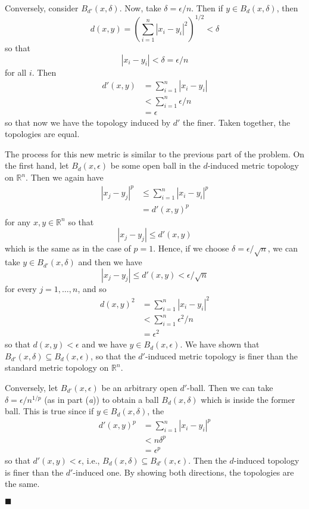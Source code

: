 \documentclass[12pt]{article}
\renewcommand{\qed}{\hfill$\blacksquare$}
\renewenvironment{proof}{\begin{addmargin}[1em]{0em}\begin{newproof}}{\end{newproof}\end{addmargin}\qed}
\begin{document}
\begin{proof}
	Conversely, consider $B_{d'}\left(x,\delta\right)$. Now, take $\delta = \epsilon/n$. Then if $y \in B_{d}\left(x,\delta\right)$, then $$ d\left(x,y\right) = \left(\sum_{i=1}^n \left|x_i-y_i\right|^2\right)^{1/2} < \delta $$ so that $$ \left|x_i - y_i\right| < \delta = \epsilon/n $$ for all $i$. Then
\begin{align*}		
	d'\left(x,y\right) & = \sum_{i=1}^n \left|x_i-y_i\right| \\
	& < \sum_{i=1}^n \epsilon/n \\
	& = \epsilon
\end{align*}
so that now we have the topology induced by $d'$ the finer. Taken together, the topologies are equal.

	\item The process for this new metric is similar to the previous part of the problem. On the first hand, let $B_d\left(x,\epsilon\right)$ be some open ball in the $d$-induced metric topology on $\mathbb{R}^n$. Then we again have \begin{align*}
	\left|x_j-y_j\right|^p & \leq \sum_{i=1}^n \left|x_i - y_i\right|^p \\
	&  = d'\left(x,y\right)^p
	\end{align*} for any $x,y\in \mathbb{R}^n$ so that $$ \left|x_j - y_j\right| \leq d'\left(x,y\right)$$ which is the same as in the case of $p=1$. Hence, if we choose $\delta = \epsilon/\sqrt{n}$, we can take $y \in B_{d'}\left(x,\delta\right)$ and then we have $$ \left|x_j - y_j\right| \leq d'\left(x,y\right) < \epsilon/\sqrt{n} $$ for every $j=1,\ldots,n$, and so
	\begin{align*}
	d\left(x,y\right)^2 & = \sum_{i=1}^n \left|x_i - y_i\right|^2 \\
	& <\sum_{i=1}^n \epsilon^2 / n \\
	& = \epsilon^2
	\end{align*}
	so that $d\left(x,y\right)<\epsilon$ and we have $y \in B_d\left(x,\epsilon\right)$. We have shown that $B_{d'}\left(x,\delta\right) \subseteq B_d\left(x,\epsilon\right)$, so that the $d'$-induced metric topology is finer than the standard metric topology on $\mathbb{R}^n$.
	
	Conversely, let $B_{d'}\left(x,\epsilon\right)$ be an arbitrary open $d'$-ball. Then we can take $\delta = \epsilon/n^{1/p}$ (as in part (\textit{a})) to obtain a ball $B_{d}\left(x,\delta\right)$ which is inside the former ball. This is true since if $y \in B_{d}\left(x,\delta\right)$, the
	\begin{align*}
		d'\left(x,y\right)^p & = \sum_{i=1}^n \left|x_i-y_i\right|^p \\
		& < n \delta^p \\
		& = \epsilon^p
	\end{align*}
	so that $d'\left(x,y\right) < \epsilon$, i.e., $B_d\left(x,\delta\right) \subseteq B_{d'}\left(x,\epsilon\right)$. Then the $d$-induced topology is finer than the $d'$-induced one. By showing both directions, the topologies are the same.
\end{proof}
\end{document}
